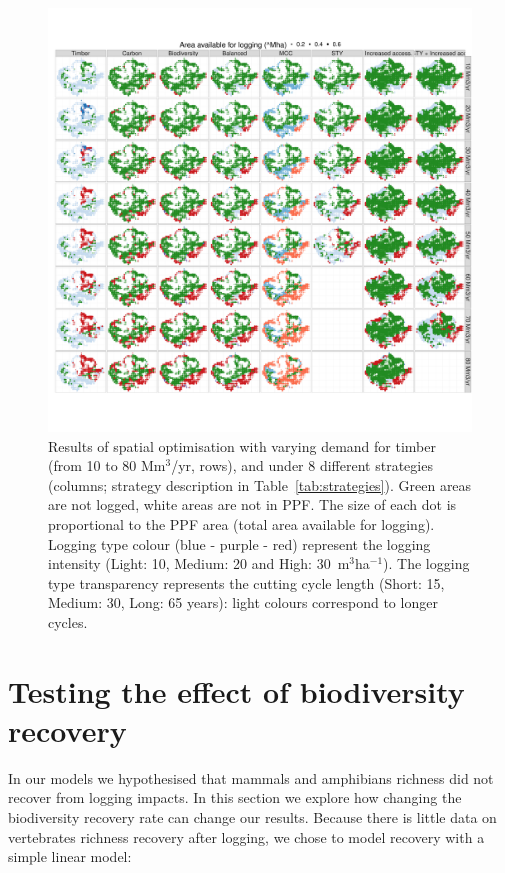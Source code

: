 \documentclass[12pt]{article}
\begin{document}
\clearpage

\begin{figure}
    \centering
    \includegraphics[width=\linewidth]{graphs/mapsChangeDemand.pdf}
    \caption{Results of spatial optimisation with varying demand for timber (from 10 to 80 Mm$^3$/yr, rows), and under 8 different strategies (columns; strategy description in Table~\ref{tab:strategies}). Green areas are not logged, white areas are not in PPF. The size of each dot is proportional to the PPF area (total area available for logging). Logging type colour (blue - purple - red) represent the logging intensity (Light: 10, Medium: 20 and High: 30~m$^3$ha$^{-1}$). The logging type transparency represents the cutting cycle length (Short: 15, Medium: 30, Long: 65 years): light colours correspond to longer cycles.}
    \label{fig:mapsIncDemand}
\end{figure}


\section{Testing the effect of biodiversity recovery}
\label{sec:biodivRec}

In our models we hypothesised that mammals and amphibians richness did not recover from logging impacts. In this section we explore how changing the biodiversity recovery rate can change our results. 
Because there is little data on vertebrates richness recovery after logging, we chose to model recovery with a simple linear model:
\end{document}
